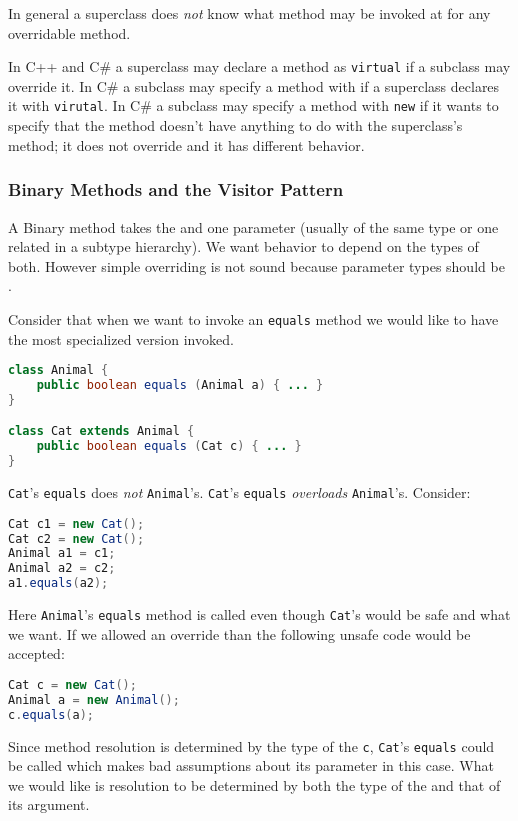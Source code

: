 \documentclass{article}
\begin{document}
In general a superclass does \textit{not} know what method may be invoked at \runtime{} for any overridable method.

In C++ and C\# a superclass may declare a method as \texttt{virtual} if a subclass may override it. In C\# a subclass may specify a method with \texttt{\override{}} if a superclass declares it with \texttt{virutal}. In C\# a subclass may specify a method with \texttt{new} if it wants to specify that the method doesn't have anything to do with the superclass's method; it does not override and it has different behavior.

\subsubsection{Binary Methods and the Visitor Pattern}

A Binary method takes the \receiver{} and one parameter (usually of the same type or one related in a subtype hierarchy). We want behavior to depend on the \textit{\dynamic{}} types of both. However simple overriding is not sound because parameter types should be \contra{}.

\begin{example}[Equals]
Consider that when we want to invoke an \texttt{equals} method we would like to have the most specialized version invoked.
\begin{lstlisting}[language=Java]
class Animal {
    public boolean equals (Animal a) { ... }
}

class Cat extends Animal {
    public boolean equals (Cat c) { ... }
}
\end{lstlisting}
\texttt{Cat}'s \texttt{equals} does \textit{not} \override{} \texttt{Animal}'s. \texttt{Cat}'s \texttt{equals} \textit{overloads} \texttt{Animal}'s.
Consider:
\begin{lstlisting}[language=Java]
Cat c1 = new Cat();
Cat c2 = new Cat();
Animal a1 = c1;
Animal a2 = c2;
a1.equals(a2);
\end{lstlisting}
Here \texttt{Animal}'s \texttt{equals} method is called even though \texttt{Cat}'s would be safe and what we want.
If we allowed an override than the following unsafe code would be accepted:
\begin{lstlisting}[language=Java]
Cat c = new Cat();
Animal a = new Animal();
c.equals(a);
\end{lstlisting}
Since method resolution is determined by the \dynamic{} type of the \receiver{} \texttt{c}, \texttt{Cat}'s \texttt{equals} could be called which makes bad assumptions about its parameter in this case. What we would like is resolution to be determined by both the \dynamic{} type of the \receiver{} and that of its argument.
\end{example}
\end{document}
